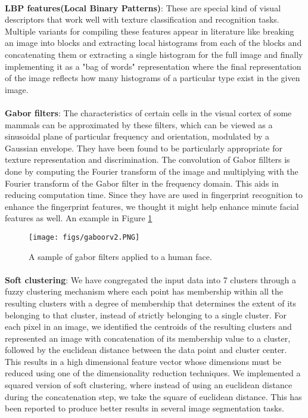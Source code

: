 \documentclass[10pt,twocolumn,letterpaper]{article}
\begin{document}
\paragraph{}
\textbf{LBP features(Local Binary Patterns)}: These are special kind of visual descriptors that work well with texture classification and recognition tasks. Multiple variants for compiling these features appear in literature like breaking an image into blocks and extracting local histograms from each of the blocks and concatenating them or extracting a single histogram for the full image and finally implementing it as a "bag of words" representation where the final representation of the image reflects how many histograms of a particular type exist in the given  image. 

\paragraph{}
\textbf{Gabor filters}: The characteristics of certain cells in the visual cortex of some mammals can be approximated by these filters, which can be viewed as a sinusoidal plane of particular frequency and orientation, modulated by a Gaussian envelope. They have been found to be particularly appropriate for texture representation and discrimination. The convolution of Gabor fillters is done by computing the Fourier transform of the image and multiplying with the Fourier transform of the Gabor filter in the frequency domain. This aids in reducing computation time. Since they have are used in fingerprint recognition to enhance the fingerprint features, we thought it might help enhance minute facial features as well. An example in Figure \ref{fig:gabor_image}

\begin{figure}[h]
\texttt{[image: figs/gaboorv2.PNG]}
\caption{A sample of gabor filters applied to a human face.}
\label{fig:gabor_image}
\end{figure}
\paragraph{}

\textbf{Soft clustering}: We have congregated the input data into 7 clusters through a fuzzy clustering mechanism where each point has membership within all the resulting clusters with a degree of membership that determines the extent of its belonging to that cluster, instead of strictly belonging to a single cluster. For each pixel in an image, we identified the centroids of the resulting clusters and represented an image with concatenation of its membership value to a cluster, followed by the euclidean distance between the data point and cluster center. This results in a high dimensional feature vector whose dimensions must be reduced using one of the dimensionality reduction techniques. We implemented a squared version of soft clustering, where instead of using an euclidean distance during the concatenation step, we take the square of euclidean distance. This has been reported to produce better results in several image segmentation tasks.
\end{document}
